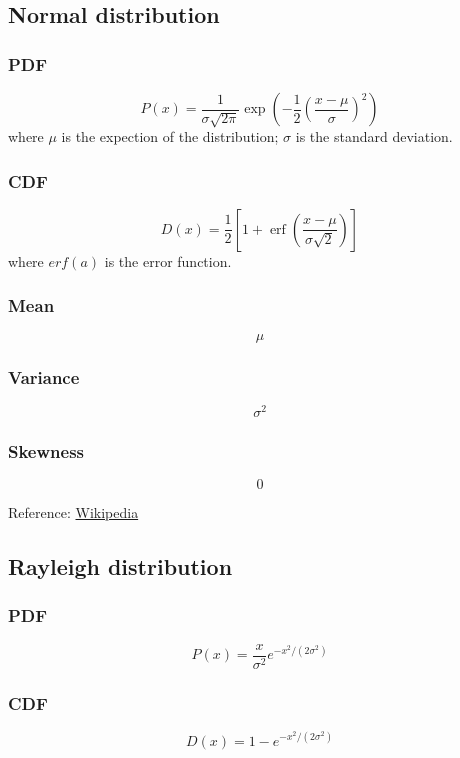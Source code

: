 \subsection{Normal distribution}

\subsubsection*{PDF}
\[
    P(x) = {\frac{1}{\sigma{\sqrt {2\pi }}}}
        \exp{(-{\frac {1}{2}} 
        \left({\frac {x-\mu }{\sigma }}\right)^{2})}
\]
where $\mu$ is the expection of the distribution; 
$\sigma$ is the standard deviation.

\subsubsection*{CDF}
\[
    D(x) = {\frac{1}{2}} \left[1+\operatorname {erf} 
        \left({\frac {x-\mu }{\sigma {\sqrt {2}}}}\right)\right]
\]
where $erf(a)$ is the error function.

\subsubsection*{Mean}
\[
    \mu
\]

\subsubsection*{Variance}
\[
    \sigma^2
\]

\subsubsection*{Skewness}
\[
    0
\]

Reference:
\href{https://en.wikipedia.org/wiki/Normal_distribution}{Wikipedia}

\subsection{Rayleigh distribution}

\subsubsection*{PDF}
\[
    P(x) = {\frac {x}{\sigma ^{2}}}e^{-x^{2}/\left(2\sigma ^{2}\right)}
\]

\subsubsection*{CDF}
\[
    D(x) = 1 - e^{-x^{2}/\left(2\sigma ^{2}\right)}
\]

